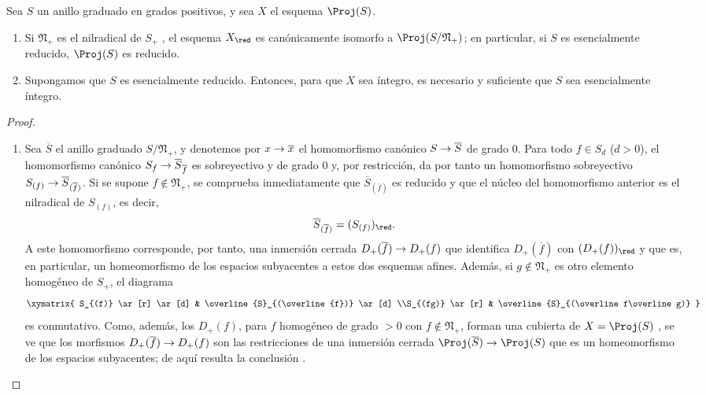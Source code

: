 \documentclass[oneside,10pt]{amsart}
\makeatletter
\newcommand{\ega@arrow}[2]{\mathchoice{#1}{#2}{#2}{#2}}
\renewcommand{\to}{\ega@arrow{\longrightarrow}{\rightarrow}}
\let\EGAOriginalLabel\label
\renewcommand{\label}[1]{\phantomsection\EGAOriginalLabel{#1}}
\makeatother
\begin{document}
\begin{proposition}[2.4.4]
\label{II.2.4.4}
Sea $S$ un anillo graduado en grados positivos, y sea $X$ el esquema $\Proj(S)$.
\begin{enumerate}
  \item[\rm(i)] Si $\mathfrak{N}_+$ es el nilradical de $S_+$ , el esquema $X_\red$ es canónicamente isomorfo a $\Proj(S/\mathfrak{N}_+)$; en particular, si $S$ es esencialmente reducido, $\Proj(S)$ es reducido.
  \item[\rm(ii)] Supongamos que $S$ es esencialmente reducido. Entonces, para que $X$ sea íntegro, es necesario y suficiente que $S$ sea esencialmente íntegro.
\end{enumerate}
\end{proposition}

\begin{proof}
\medskip\noindent
\begin{enumerate}
  \item[\rm(i)] Sea $\overline{S}$ el anillo graduado $S/\mathfrak{N}_+$, y denotemos por $x\to\overline{x}$ el homomorfismo canónico $S\to\overline{S}$ de grado $0$.
  Para todo $f\in S_d$ ($d>0$), el homomorfismo canónico $S_f\to\overline{S}_{\overline{f}}$  es sobreyectivo y de grado $0$ y, por restricción, da por tanto un homomorfismo sobreyectivo $S_{(f)}\to\overline{S}_{(\overline{f})}$.
  Si se supone $f\notin\mathfrak{N}_+$, se comprueba inmediatamente que $\overline{S}_{(\overline{f})}$ es reducido y que el núcleo del homomorfismo anterior es el nilradical de $S_{(f)}$, es decir,
  \[
    \overline{S}_{(\overline{f})}=(S_{(f)})_\red.
  \]
  A este homomorfismo corresponde, por tanto, una inmersión cerrada $D_+(\overline{f})\to D_+(f)$ que identifica $D_+(\overline{f})$ con $(D_+(f))_\red$  y que es, en particular, un homeomorfismo de los espacios subyacentes a estos dos esquemas afines.
  Además, si $g\notin\mathfrak{N}_+$ es otro elemento homogéneo de $S_+$, el diagrama
  \[
    \xymatrix{
      S_{(f)} \ar[r] \ar[d]
      & \overline{S}_{(\overline{f})} \ar[d]
    \\S_{(fg)} \ar[r]
      & \overline{S}_{(\overline f\overline g)}
    }
  \]
  es conmutativo.
  Como, además, los $D_+(f)$, para $f$ homogéneo de grado $>0$ con $f\notin\mathfrak{N}_+$, forman una cubierta de $X=\Proj(S)$ , se ve que los morfismos $D_+(\overline{f})\to D_+(f)$ son las restricciones de una inmersión cerrada $\Proj(\overline{S})\to\Proj(S)$ que es un homeomorfismo de los espacios subyacentes; de aquí resulta la conclusión .

\end{enumerate}
\end{proof}
\end{document}
